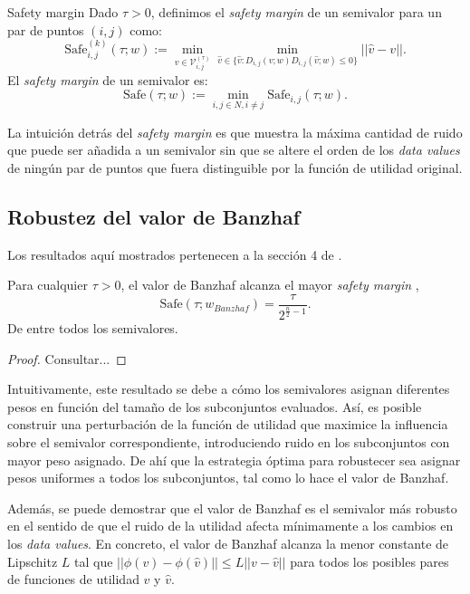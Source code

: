 \begin{definition}{Safety margin}
  Dado $\tau > 0$, definimos el \textit{safety margin} de un
  semivalor para un par de puntos $(i,j)$ como:
  \begin{equation*}
    \text{Safe}_{i,j}^{(k)}(\tau;w):=\min_{v \in \mathcal{V}_{i,j}^{(\tau)}}
    \min_{\hat{v} \in \{\hat{v}:D_{i,j}(v;w)D_{i,j}(\hat{v};w)\leq 0\}}
    ||\hat{v} - v||.
  \end{equation*}
  El \textit{safety margin} de un semivalor es:
  \begin{equation*}
    \text{Safe}(\tau;w):=\min_{i,j \in N, i \neq j} \text{Safe}_{i,j}(\tau;w).
  \end{equation*}
\end{definition}

La intuición detrás del \textit{safety margin} es que muestra
la máxima cantidad de ruido que puede ser añadida a un semivalor sin que
se altere el orden de los \textit{data values} de ningún par de
puntos que fuera distinguible por la función de utilidad original.


\subsection{Robustez del valor de Banzhaf}
Los resultados aquí mostrados pertenecen a la sección 4
de \cite{dataBanzhaf}.

\begin{theorem}
  Para cualquier $\tau > 0$, el valor de Banzhaf
  alcanza el mayor \textit{safety margin} ,
  \[
  \text{Safe}(\tau;w_{Banzhaf})=\frac{\tau}{2^{\frac{n}{2}-1}}.  
  \]
  De entre todos los semivalores.
\end{theorem}

\begin{proof}
  Consultar...
\end{proof}

Intuitivamente, este resultado se debe a cómo los
semivalores asignan diferentes pesos en función del
tamaño de los subconjuntos evaluados. Así, es posible
construir una perturbación de la función de utilidad
que maximice la influencia sobre el semivalor
correspondiente, introduciendo ruido en los subconjuntos
con mayor peso asignado. De ahí que la estrategia
óptima para robustecer sea asignar pesos uniformes a
todos los subconjuntos, tal como lo hace el valor de Banzhaf.

Además, se puede demostrar que el valor de Banzhaf es
el semivalor más robusto en el sentido de que el ruido
de la utilidad afecta mínimamente a los cambios en los
\textit{data values}. En concreto, el valor de
Banzhaf alcanza la menor constante de Lipschitz $L$
tal que $||\phi(v)-\phi(\hat{v})|| \leq L||v-\hat{v}||$
para todos los posibles pares de funciones de utilidad
$v$ y $\hat{v}$.


